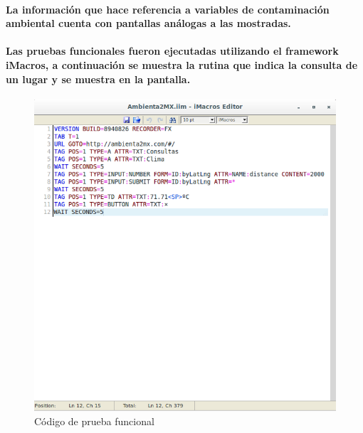     \paragraph{La información que hace referencia a variables de contaminación ambiental cuenta con pantallas análogas a las mostradas.}
    \paragraph{Las pruebas funcionales fueron ejecutadas utilizando el framework \textbf{iMacros}, a continuación se muestra la rutina que indica la consulta de un lugar y se muestra en la pantalla.}
    \begin{figure}[b!]
      \centering
        \includegraphics[width=\textwidth]{./images/funcional}
      \caption{Código de prueba funcional}
    \end{figure}
